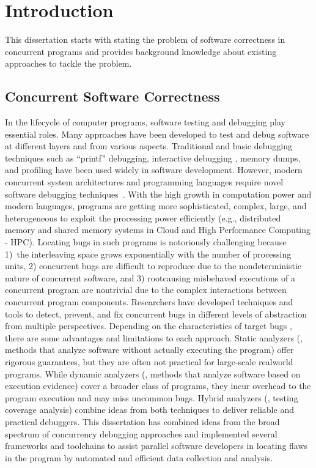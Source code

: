 \chapter{Introduction}
\label{sec:ch1}
This dissertation starts with stating the problem of software correctness in concurrent programs and provides background knowledge about existing approaches to tackle the problem.

\section{Concurrent Software Correctness}
\label{kir}
In the lifecycle of computer programs, software testing and debugging play essential roles.
%
Many approaches have been developed to test and debug software at different layers and from various aspects.
%
Traditional and basic debugging techniques such as ``printf'' debugging, interactive debugging \cite{ddt, totalview}, memory dumps, and profiling have been used widely in software development.
%
%
However, modern concurrent system architectures and programming languages require novel software debugging techniques~\cite{hpcdoe}.
%
With the high growth in computation power and modern languages, programs are getting more sophisticated, complex, large, and heterogeneous to exploit the processing power efficiently (e.g., distributed memory and shared memory systems in  Cloud and High Performance Computing - HPC).
%
Locating bugs in such programs is notoriously challenging because 1)~the interleaving space grows exponentially with the number of processing units, 2) concurrent bugs are difficult to reproduce due to the nondeterministic nature of concurrent software, and 3) rootcausing misbehaved executions of a concurrent program are nontrivial due to the complex interactions between concurrent program components.
%
Researchers have developed techniques and tools to detect, prevent, and fix concurrent bugs in different levels of abstraction from multiple perspectives.
%
Depending on the characteristics of target bugs \cite{shanlu-mistakes-asplos08}, there are some advantages and limitations to each approach.
%
Static analyzers (\ie, methods that analyze software without actually executing the program) offer rigorous guarantees, but they are often not practical for large-scale realworld programs.
%
While dynamic analyzers (\ie, methods that analyze software based on execution evidence) cover a broader class of programs, they incur overhead to the program execution and may miss uncommon bugs.
%
Hybrid analyzers (\eg, testing coverage analysis) combine ideas from both techniques to deliver reliable and practical debuggers.
%
This dissertation has combined ideas from the broad spectrum of concurrency debugging approaches and implemented several frameworks and toolchains to assist parallel software developers in locating flaws in the program by automated and efficient data collection and analysis.

